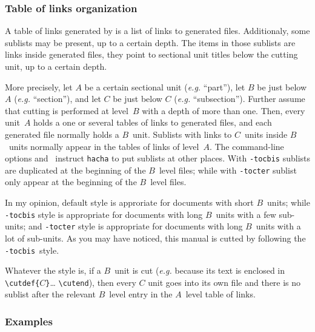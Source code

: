 \subsubsection{Table\label{table:link:style} of links organization}
A table of links generated by \hacha{} is a list
of links to generated files.
Additionaly, some sublists may be present, up to a certain depth.
The items in those sublists are
links inside generated files, they point to sectional unit titles
below the cutting unit, up to a certain depth.

More precisely, let $A$ be a certain sectional unit (\emph{e.g.}
``part''), let $B$ be just below $A$
(\emph{e.g.} ``section''),
and let $C$ be just below $C$ (\emph{e.g.} ``subsection'').
Further assume that cutting is performed at level~$B$ with a depth of
more than one.
Then, every unit~$A$ holds a one or several tables of links
to generated files, and each generated file normally holds a $B$~unit.
Sublists with links to $C$~units inside $B$~units normally appear in the
tables of links of level~$A$.
The command-line options 
and~ instruct \texttt{hacha}
to put sublists at other places.
With \texttt{-tocbis} sublists are duplicated at the beginning
of the $B$~level files; while with \texttt{-tocter} sublist only
appear at the beginning
of the $B$~level files.

In my opinion,
default style is approriate for documents with short $B$~units;
while \texttt{-tocbis} style
is appropriate for documents with long $B$~units with
a few sub-units; and \texttt{-tocter} style is appropriate
for documents with long $B$~units with
a lot of sub-units.
\ifhevea
As you may have noticed, this manual is cutted by following the
\texttt{-tocbis}~style.\fi

Whatever the style is, if a $B$~unit is cut
(\emph{e.g.} because its text is enclosed in
\verb+\cutdef{+$C$\verb+}+\ldots{} \verb+\cutend+),
then every $C$ unit goes into its own file and there is no sublist
after the relevant $B$~level entry in the $A$~level table of links.

\subsubsection{Examples}

